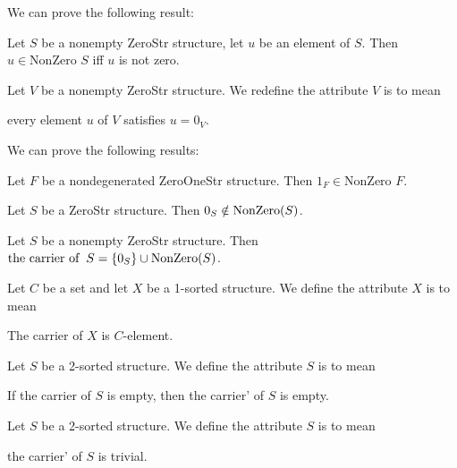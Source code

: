 \documentclass{article}
\begin{document}
We can prove the following result:
\begin{thm}
\item\label{struct0:1} Let $S$ be a nonempty ZeroStr structure, let $u$
  be an element of $S$. Then $u\in\mbox{NonZero\ }S$ iff $u$ is not zero.
\end{thm}

\begin{definition}
Let $V$ be a nonempty ZeroStr structure.
We redefine the attribute $V$ is  to mean
\begin{defn}
\item every element $u$ of $V$ satisfies $u=0_{V}$.
\end{defn}
\end{definition}

We can prove the following results:
\begin{thm}
\item\label{struct0:2} Let $F$ be a nondegenerated ZeroOneStr structure.
  Then $1_{F}\in\mbox{NonZero\ }F$.
\item\label{struct0:3} Let $S$ be a ZeroStr structure. Then $0_{S}\notin\operatorname{NonZero}(S)$.
\item\label{struct0:4} Let $S$ be a nonempty ZeroStr structure.
  Then $\operatorname{the\ carrier\ of\ }S=\{0_{S}\}\cup\operatorname{NonZero}(S)$.
\end{thm}

\begin{definition}
Let $C$ be a set and let $X$ be a 1-sorted structure.
We define the attribute $X$ is  to mean
\begin{defn}
\item The carrier of $X$ is $C$-element.
\end{defn}
\end{definition}

\begin{definition}
Let $S$ be a 2-sorted structure.
We define the attribute $S$ is  to mean
\begin{defn}
\item If the carrier of $S$ is empty, then the carrier' of $S$ is empty.
\end{defn}
\end{definition}

\begin{definition}
Let $S$ be a 2-sorted structure. We define the attribute $S$ is 
to mean
\begin{defn}
\item the carrier' of $S$ is trivial.
\end{defn}
\end{definition}
\end{document}
